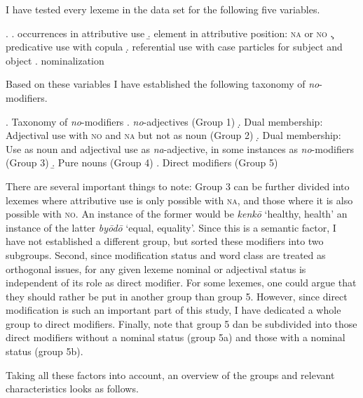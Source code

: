 \documentclass [output=book,colorlinks,citecolor=brown]{langscibook}
\begin{document}
I have tested every lexeme in the data set for the following five variables. %

\ex. \a. occurrences in attributive use
\b. element in attributive position: \textsc{na} or \textsc{no}
\c. predicative use with copula
\d. referential use with case particles for subject and object
\e. nominalization

Based on these variables I have established the following taxonomy of \textit{no}-modifiers.

\ex. Taxonomy of \textit{no}-modifiers
\a. \textit{no}-adjectives (Group 1)
\d. Dual membership: Adjectival use with \textsc{no} and \textsc{na} but not as noun (Group 2)
\d. Dual membership: Use as noun and adjectival use as \textit{na}-adjective, in some instances as \textit{no}-modifiers (Group 3)
\b. Pure nouns (Group 4)
\e. Direct modifiers (Group 5)

There are several important things to note: Group 3 can be further divided into lexemes where attributive use is only possible with \textsc{na}, and those where it is also possible with \textsc{no}. An instance of the former would be \textit{kenkō} `healthy, health’ an instance of the latter \textit{byōdō} `equal, equality’. Since this is a semantic factor, I have not established a different group, but sorted these modifiers into two subgroups. Second, since modification status and word class are treated as orthogonal issues, for any given lexeme nominal or adjectival status is independent of its role as direct modifier. For some lexemes, one could argue that they should rather be put in another group than group 5. However, since direct modification is such an important part of this study, I have dedicated a whole group to direct modifiers. Finally, note that group 5 dan be subdivided into those direct modifiers without a nominal status (group 5a) and those with a nominal status (group 5b). %

Taking all these factors into account, an overview of the groups and relevant characteristics looks as follows.
\end{document}
